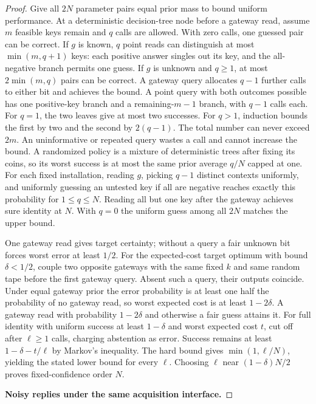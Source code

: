\begin{proof}
Give all \(2N\) parameter pairs equal prior mass to bound uniform performance. At a deterministic decision-tree node before a gateway read, assume \(m\) feasible keys remain and \(q\) calls are allowed. With zero calls, one guessed pair can be correct. If \(g\) is known, \(q\) point reads can distinguish at most \(\min(m,q+1)\) keys: each positive answer singles out its key, and the all-negative branch permits one guess. If \(g\) is unknown and \(q\ge1\), at most \(2\min(m,q)\) pairs can be correct. A gateway query allocates \(q-1\) further calls to either bit and achieves the bound. A point query with both outcomes possible has one positive-key branch and a remaining-\(m-1\) branch, with \(q-1\) calls each. For \(q=1\), the two leaves give at most two successes. For \(q>1\), induction bounds the first by two and the second by \(2(q-1)\). The total number can never exceed \(2m\). An uninformative or repeated query wastes a call and cannot increase the bound. A randomized policy is a mixture of deterministic trees after fixing its coins, so its worst success is at most the same prior average \(q/N\) capped at one. For each fixed installation, reading \(g\), picking \(q-1\) distinct contexts uniformly, and uniformly guessing an untested key if all are negative reaches exactly this probability for \(1\le q\le N\). Reading all but one key after the gateway achieves sure identity at \(N\). With \(q=0\) the uniform guess among all \(2N\) matches the upper bound.

One gateway read gives target certainty; without a query a fair unknown bit forces worst error at least \(1/2\). For the expected-cost target optimum with bound \(\delta<1/2\), couple two opposite gateways with the same fixed \(k\) and same random tape before the first gateway query. Absent such a query, their outputs coincide. Under equal gateway prior the error probability is at least one half the probability of no gateway read, so worst expected cost is at least \(1-2\delta\). A gateway read with probability \(1-2\delta\) and otherwise a fair guess attains it. For full identity with uniform success at least \(1-\delta\) and worst expected cost \(t\), cut off after \(\ell\ge1\) calls, charging abstention as error. Success remains at least \(1-\delta-t/\ell\) by Markov's inequality. The hard bound gives \(\min(1,\ell/N)\), yielding the stated lower bound for every \(\ell\). Choosing \(\ell\) near \((1-\delta)N/2\) proves fixed-confidence order \(N\).

\textbf{Noisy replies under the same acquisition interface.}


\end{proof}
